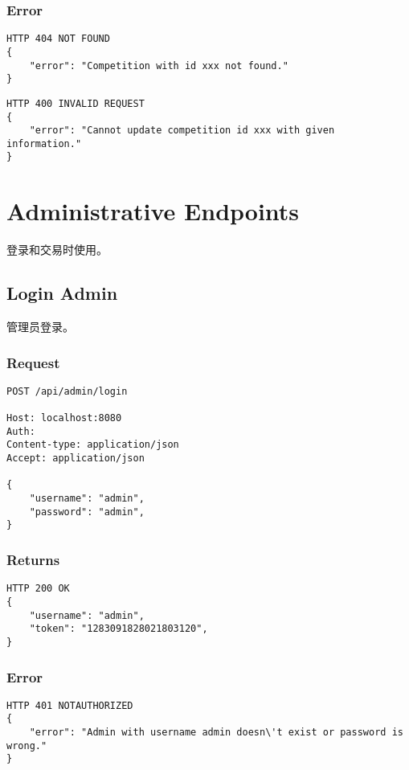 \documentclass{article}
\begin{document}
\subsubsection*{Error}
\begin{lstlisting}
HTTP 404 NOT FOUND
{
    "error": "Competition with id xxx not found."
}
\end{lstlisting}

\begin{lstlisting}
HTTP 400 INVALID REQUEST
{
    "error": "Cannot update competition id xxx with given information."
}
\end{lstlisting}

\section{Administrative Endpoints}
登录和交易时使用。

\subsection{Login Admin}
管理员登录。

\subsubsection*{Request}
\begin{lstlisting}
POST /api/admin/login

Host: localhost:8080
Auth:
Content-type: application/json
Accept: application/json

{
    "username": "admin",
    "password": "admin",
}
\end{lstlisting}

\subsubsection*{Returns}
\begin{lstlisting}
HTTP 200 OK
{
    "username": "admin",
    "token": "1283091828021803120",
}

\end{lstlisting}

\subsubsection*{Error}
\begin{lstlisting}
HTTP 401 NOTAUTHORIZED
{
    "error": "Admin with username admin doesn\'t exist or password is wrong."
}
\end{lstlisting}
\end{document}
